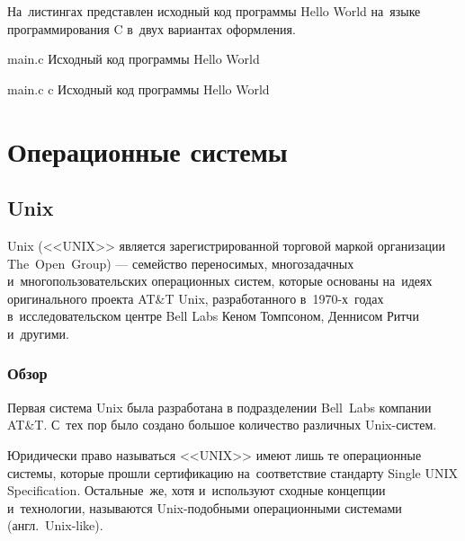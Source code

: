 \documentclass{bmstu}
\begin{document}


На~листингах представлен исходный код программы Hello World на~языке программирования C в~двух вариантах оформления.

    {main.c} %
    {Исходный код программы Hello World} %

    {main.c} %
    {c} %
    {Исходный код программы Hello World} %


\chapter{Операционные системы}

\section{Unix}

Unix (<<UNIX>> является зарегистрированной торговой маркой организации The~Open~Group) --- семейство переносимых, многозадачных и~многопользовательских операционных систем, которые основаны на~идеях оригинального проекта AT\&T Unix, разработанного в~1970-х~годах в~исследовательском центре Bell Labs Кеном Томпсоном, Деннисом Ритчи и~другими.

\subsection{Обзор}

Первая система Unix была разработана в подразделении Bell~Labs компании AT\&T. С~тех пор было создано большое количество различных Unix-систем.

Юридически право называться <<UNIX>> имеют лишь те операционные системы, которые прошли сертификацию на~соответствие стандарту Single UNIX Specification.
Остальные~же, хотя и~используют сходные концепции и~технологии, называются Unix-подобными операционными системами (англ.~Unix-like).
\end{document}
